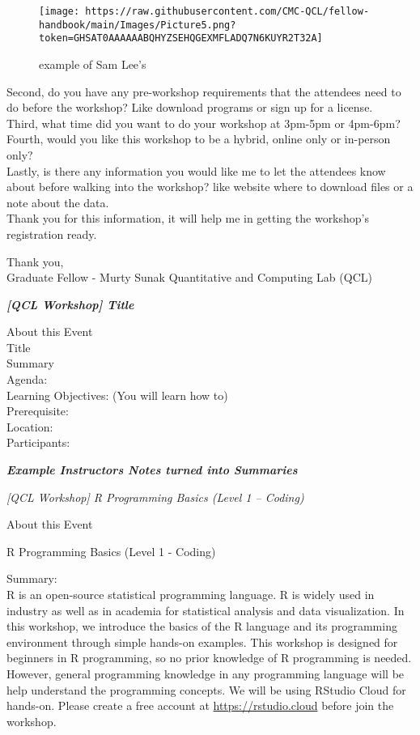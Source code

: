 \documentclass[
]{book}
\begin{document}
\begin{figure}
\centering
\texttt{[image: https://raw.githubusercontent.com/CMC-QCL/fellow-handbook/main/Images/Picture5.png?token=GHSAT0AAAAAABQHYZSEHQGEXMFLADQ7N6KUYR2T32A]}
\caption{example of Sam Lee's}
\end{figure}

Second, do you have any pre-workshop requirements that the attendees need to do before the workshop? Like download programs or sign up for a license.\\
Third, what time did you want to do your workshop at 3pm-5pm or 4pm-6pm?\\
Fourth, would you like this workshop to be a hybrid, online only or in-person only?\\
Lastly, is there any information you would like me to let the attendees know about before walking into the workshop? like website where to download files or a note about the data.\\
Thank you for this information, it will help me in getting the workshop's registration ready.

Thank you,\\
Graduate Fellow - Murty Sunak Quantitative and Computing Lab (QCL)

\textbf{\emph{{[}QCL Workshop{]} Title}}

About this Event\\
Title\\
Summary\\
Agenda:\\
Learning Objectives: (You will learn how to)\\
Prerequisite:\\
Location:\\
Participants:

\textbf{\emph{Example Instructors Notes turned into Summaries}}

\emph{{[}QCL Workshop{]} R Programming Basics (Level 1 -- Coding)}

About this Event

R Programming Basics (Level 1 - Coding)

Summary:\\
R is an open-source statistical programming language. R is widely used in industry as well as in academia for statistical analysis and data visualization. In this workshop, we introduce the basics of the R language and its programming environment through simple hands-on examples.
This workshop is designed for beginners in R programming, so no prior knowledge of R programming is needed. However, general programming knowledge in any programming language will be help understand the programming concepts.
We will be using RStudio Cloud for hands-on. Please create a free account at \url{https://rstudio.cloud} before join the workshop.
\end{document}
